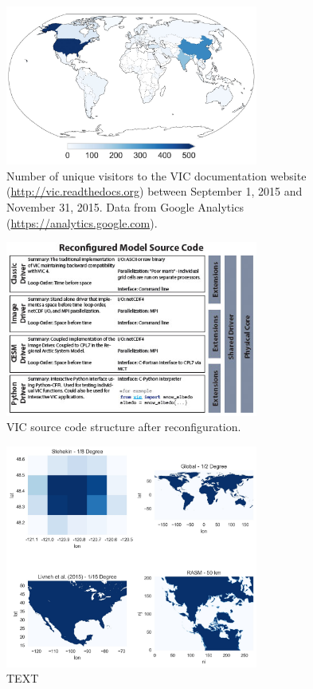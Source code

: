 \documentclass[gmd, manuscript]{copernicus}
\begin{document}


\begin{figure}[t]
\includegraphics[width=8.3cm]{VIC_users.jpg}
\caption{Number of unique visitors to the VIC documentation website (\url{http://vic.readthedocs.org}) between September 1, 2015 and November 31, 2015. Data from Google Analytics (\url{https://analytics.google.com}).}
\label{fig:vic_users}
\end{figure}

\begin{figure}[t]
\includegraphics[width=8.3cm]{VIC_config.jpg}
\caption{VIC source code structure after reconfiguration. }
\label{fig:vic_config}
\end{figure}

%
%
\begin{figure}[t]
\includegraphics[width=8.3cm]{VIC_domains.jpg}
\caption{TEXT}
\label{fig:vic_domains}
\end{figure}
\end{document}
